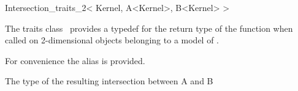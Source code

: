\begin{ccRefClass}{Intersection_traits_2< Kernel, A<Kernel>, B<Kernel> >}


\ccDefinition

The traits class \ccClassTemplateName\ provides a typedef for the
return type of the  function when called on
2-dimensional objects belonging to a model of .

For convenience the alias  is provided.

\ccTypes

 The type of the resulting intersection between A and B
\end{ccRefClass}


